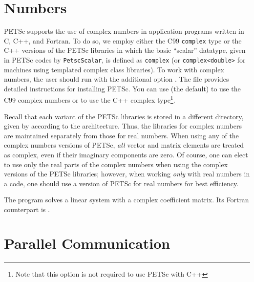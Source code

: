 {{{\section{Numbers}  \label{sec_complex}

PETSc supports the use of complex numbers in application programs
written in C, C++, and Fortran.  To do so, we employ either the C99 \lstinline{complex} type or the C++ versions of
the PETSc libraries in which the basic ``scalar'' datatype, given in
PETSc codes by \lstinline{PetscScalar}, is defined as \lstinline{complex} (or \lstinline{complex<double>}
 for machines using templated complex class
libraries).  To work with complex numbers,
the user should run  with the additional option .
The file \href{https://www.mcs.anl.gov/petsc/documentation/installation.html}{}
provides detailed instructions for installing PETSc.
You can use  (the default) to use the C99 complex numbers or 
to use the C++ complex type\footnote{Note that this option is not required to use PETSc with C++}.

Recall that each variant of the PETSc libraries is stored in a
different directory, given by
according to the architecture. Thus, the
libraries for complex
numbers are maintained separately from those for real
numbers.  When using any of the complex numbers versions of PETSc,
{\em all} vector and matrix elements are treated as complex,
even if their imaginary components are zero.
Of course, one can elect to use only the real parts of the complex
numbers when using the complex versions of the PETSc libraries;
however, when working {\em only} with real numbers in a code,
one should use a version of PETSc for real numbers for best efficiency.

The program \href{https://www.mcs.anl.gov/petsc/petsc-current/src/ksp/ksp/tutorials/ex11.c.html}{}
solves a linear system with a complex
coefficient matrix.  Its Fortran counterpart is
\href{https://www.mcs.anl.gov/petsc/petsc-current/src/ksp/ksp/tutorials/ex11f.F90.html}{}.

\section{Parallel Communication}

}}}
